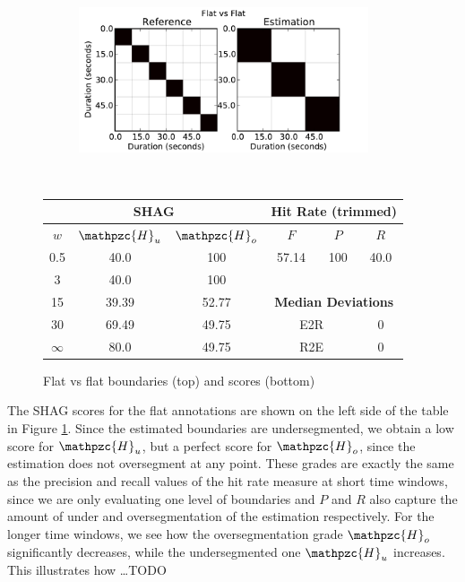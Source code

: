 \documentclass{article}
\begin{document}
\begin{figure}
  \centering
  \begin{subfigure}{0.5\textwidth}
    \centering
    \includegraphics[width=0.94\textwidth]{plots/flat-flat.pdf}
  \end{subfigure}%
  \\
  \begin{minipage}{0.5\textwidth}
    \centering
    \vspace{10pt}
    \begin{tabular}{|c|c|c||c|c|c|}
      \hline
      \multicolumn{3}{|c||}{\textbf{SHAG}} & \multicolumn{3}{c|}{\textbf{Hit Rate (trimmed)}} \\
      \hline
      $w$ & $\mathpzc{H}_u$   & $\mathpzc{H}_o$ & $F$     & $P$     & $R$ \\
      \hline
      0.5       & 40.0   & 100   & 57.14  & 100 & 40.0 \\
      \cline{4-6}
      3         & 40.0   & 100  \\
      \cline{4-6}
      15        & 39.39  & 52.77 & \multicolumn{3}{c|}{\textbf{Median Deviations}}   \\
      \cline{4-6}
      30        & 69.49  & 49.75 & \multicolumn{2}{c|}{E2R} & 0 \\
      $\infty$  & 80.0   & 49.75 & \multicolumn{2}{c|}{R2E} & 0 \\  
      \hline
    \end{tabular}
  \end{minipage}
  \caption{Flat vs flat boundaries (top) and scores (bottom)}
  \label{fig:flat-flat}
\end{figure}

The SHAG scores for the flat annotations are shown on the left side of the table in Figure \ref{fig:flat-flat}.
Since the estimated boundaries are undersegmented, we obtain a low score for $\mathpzc{H}_u$, but a perfect score for $\mathpzc{H}_o$, since the estimation does not oversegment at any point.
These grades are exactly the same as the precision and recall values of the hit rate measure at short time windows, since we are only evaluating one level of boundaries and $P$ and $R$ also capture the amount of under and oversegmentation of the estimation respectively.
For the longer time windows, we see how the oversegmentation grade $\mathpzc{H}_o$ significantly decreases, while the undersegmented one $\mathpzc{H}_u$ increases.
This illustrates how \dots TODO
\end{document}
